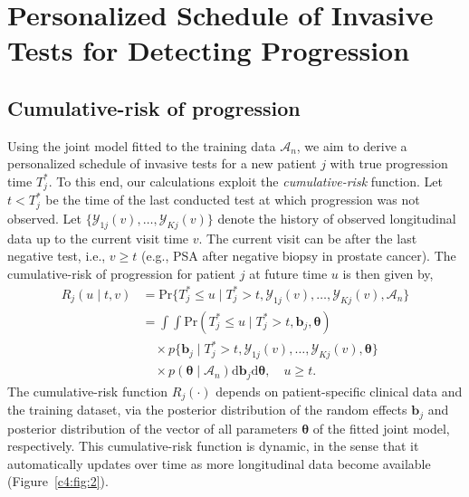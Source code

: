 \section{Personalized Schedule of Invasive Tests for Detecting Progression} 
\label{c4:sec:schedule}

\subsection{Cumulative-risk of progression} 
\label{c4:subsec:cum_risk}
Using the joint model fitted to the training data $\mathcal{A}_n$, we aim to derive a personalized schedule of invasive tests for a new patient $j$ with true progression time $T^*_j$. To this end, our calculations exploit the \emph{cumulative-risk} function. Let $t<T^*_j$ be the time of the last conducted test at which progression was not observed. Let $\{\mathcal{Y}_{1j}(v), \ldots, \mathcal{Y}_{Kj}(v)\}$ denote the history of observed longitudinal data up to the current visit time $v$. The current visit can be after the last negative test, i.e., $v \geq t$ (e.g., PSA after negative biopsy in prostate cancer). The cumulative-risk of progression for patient $j$ at future time $u$ is then given by,
\begin{equation}
\label{c4:eq:cumulative_risk}
\begin{split}
R_j(u \mid t, v) &= \mbox{Pr}\big\{T^*_j \leq u \mid T^*_j > t, \mathcal{Y}_{1j}(v), \ldots, \mathcal{Y}_{Kj}(v), \mathcal{A}_n\big\}\\
&=\int \int \mbox{Pr}(T^*_j \leq u \mid T^*_j > t, \boldsymbol{b}_{j}, \boldsymbol{\theta})\\
&\quad \times p\big\{\boldsymbol{b}_j \mid T^*_j > t, \mathcal{Y}_{1j}(v), \ldots, \mathcal{Y}_{Kj}(v), \boldsymbol{\theta} \big\}\\
& \quad \times p(\boldsymbol{\theta} \mid \mathcal{A}_n) \mathrm{d}\boldsymbol{b}_j \mathrm{d}\boldsymbol{\theta}, \quad u \geq t.
\end{split}
\end{equation}
The cumulative-risk function $R_j(\cdot)$ depends on patient-specific clinical data and the training dataset, via the posterior distribution of the random effects $\boldsymbol{b}_{j}$ and posterior distribution of the vector of all parameters $\boldsymbol{\theta}$ of the fitted joint model, respectively. This cumulative-risk function is dynamic, in the sense that it automatically updates over time as more longitudinal data become available (Figure~\ref{c4:fig:2}).
